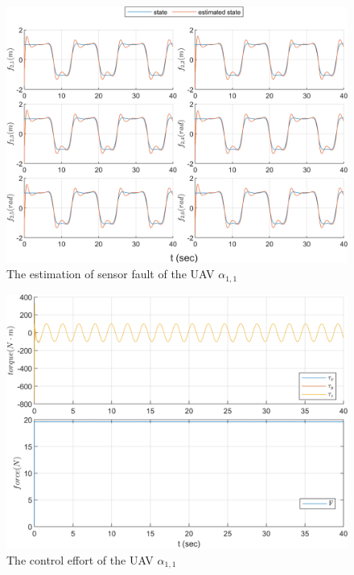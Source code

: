 \documentclass{ieeeaccess}
\begin{document}
\begin{figure}[htbp]
    \centering
    \includegraphics[scale=.57]{fig/uav (3).png}\caption{The estimation of sensor fault of the UAV $\alpha_{1,1}$}%
    \label{fig:UAV, fs}
\end{figure}
\begin{figure}[htbp]
    \centering
    \includegraphics[scale=.57]{fig/uav (4).png}\caption{The control effort of the UAV $\alpha_{1,1}$}%
    \label{fig:UAV, control}
\end{figure}
\end{document}
